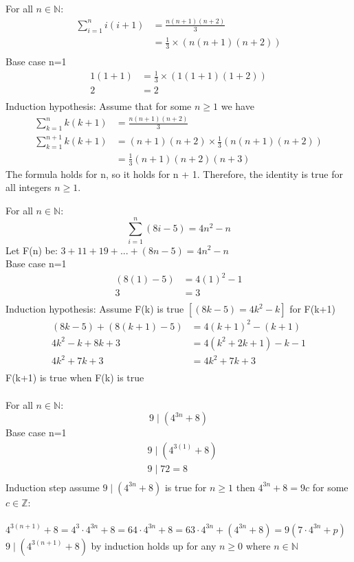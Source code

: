 \documentclass[12pt]{article}
\newcommand{\nats}{\ensuremath{\mathbb{N}}}
\begin{document}
  
\question%
For all $n\in\nats$:
\begin{align*}
  \sum_{i=1}^n i(i+1) &= \frac{n(n+1)(n+2)}{3} \\
                     &= \frac{1}{3}\times
                       \left(n\left(n+1\right)\left(n+2\right)\right) \\
\end{align*} 
\answer%
Base case n=1   
\begin{align*}
                1(1+1)&= \frac{1}{3}\times
                       \left(1\left(1+1\right)\left(1+2\right)\right) \\
                  2  &= 2\\
\end{align*}
Induction hypothesis: Assume that for some $n\ge1$ we have
\begin{align*}
   \sum_{k=1}^n k(k+1) &= \frac{n(n+1)(n+2)}{3} \\
   \sum_{k=1}^{n+1} k(k+1)&= \left(n+1\right)\left(n+2\right)\times\frac{1}{3}
                       \left(n\left(n+1\right)\left(n+2\right)\right) \\
                       &=\frac{1}{3}\left(n+1\right)\left(n+2\right)\left(n+3\right)
\end{align*}
The formula holds for n, so it holds for n + 1. Therefore, the identity is true for all integers $n\ge1$.
%


\newpage
\question%
For all $n\in\nats$:
\[
  \sum_{i=1}^n (8i-5) = 4n^2 - n  
\]
\answer Let F(n) be: $3+11+19+...+(8n - 5)=4n^2-n$\\%
Base case n=1   
\begin{align*}
                (8(1)-5)&=  4(1)^2 - 1\\
                  3  &= 3\\
\end{align*}
  Induction hypothesis: Assume F(k) is true $[(8k-5)=4k^2-k]$ for F(k+1)
\begin{align*}
        (8k-5)+(8(k+1)-5)&=4(k+1)^2−(k+1)\\
         4k^2-k+8k+3 &= 4(k^2+2k+1)-k-1\\
         4k^2+7k+3 &= 4k^2+7k+3\\
\end{align*}  
F(k+1) is true when F(k) is true\\
\\
\question%
For all $n\in\nats$:
\[
  9\mid (4^{3n} + 8)
\]
\answer%
Base case n=1   %
\begin{align*}
                &9\mid (4^{3(1)} + 8)\\
                &9\mid 72 = 8\\
\end{align*}
Induction step assume $9\mid (4^{3n} + 8)$ is true for $n\ge1$ then $4^{3n} + 8=9c$ for some $c\in\mathbb{Z}$: \\
\\
$4^{3(n+1)} + 8 = 4^3\cdot4^{3n} + 8 = 64\cdot4^{3n} + 8 = 63\cdot4^{3n} + (4^{3n} + 8) = 9(7\cdot4^{3n} + p)$\\

$9\mid (4^{3(n+1)} + 8)$ by induction holds up for any $n\ge0$ where $n\in\nats$ 
\end{document}

